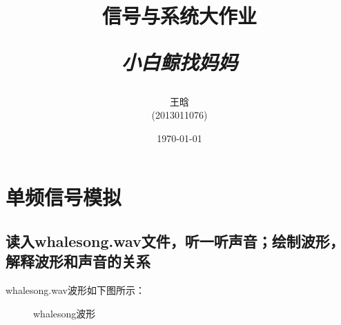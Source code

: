 \documentclass{article}
\begin{document}
	\title{\textbf{信号与系统大作业} \\ [2ex] \begin{large} \emph{小白鲸找妈妈} \end{large} }
	\author{王晗\\(2013011076)}
	\date{\today}
	\maketitle
	\section{单频信号模拟}
		\subsection{读入whalesong.wav文件，听一听声音；绘制波形，解释波形和声音的关系}
            whalesong.wav波形如下图所示：
            \begin{figure}[htb]
                \centering
                \hspace{10pt}
                \caption{whalesong波形}
                \label{fig:origin}
            \end{figure}
\end{document}
